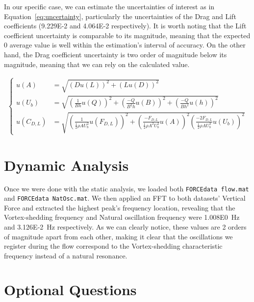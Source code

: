 \documentclass[12pt]{article}
\begin{document}
        In our specific case, we can estimate the uncertainties of interest as in Equation~\ref{eq:uncertainty}, particularly the uncertainties of the Drag and Lift coefficients (\num{9.229E-2} and \num{4.064E-2} respectively). It is worth noting that the Lift coefficient uncertainty is comparable to its magnitude, meaning that the expected 0 average value is well within the estimation's interval of accuracy. On the other hand, the Drag coefficient uncertainty is two order of magnitude below its magnitude, meaning that we can rely on the calculated value.

        \begin{align} \label{eq:uncertainty}
                \begin{cases}
                        u(A) &= \sqrt{\left(D u(L)\right)^2 + \left( L u(D) \right)^2}\\
                        u(U_b) &= \sqrt{\left(\frac{1}{B h} u(Q)\right)^2 + \left(\frac{-Q}{B^2 h} u(B)\right)^2 + \left(\frac{-Q}{B h^2} u(h)\right)^2}\\
                        u(C_{D,L}) &= \sqrt{\left(\frac{1}{\frac{1}{2} \rho A U_b^2} u(F_{D,L})\right)^2 + \left(\frac{-F_{D,L}}{\frac{1}{2} \rho A^2 U_b^2} u(A)\right)^2 \left(\frac{-2 F_{D,L}}{\frac{1}{2} \rho A U_b^3} u(U_b)\right)^2}
                \end{cases}
        \end{align}

\section{Dynamic Analysis} \label{sec:dynamic}

        Once we were done with the static analysis, we loaded both \texttt{FORCEdata flow.mat} and \texttt{FORCEdata NatOsc.mat}. We then applied an FFT to both datasets' Vertical Force and extracted the highest peak's frequency location, revealing that the Vortex-shedding frequency and Natural oscillation frequency were \SI{1.008E0}{\hertz} and \SI{3.126E-2}{\hertz} respectively. As we can clearly notice, these values are 2 orders of magnitude apart from each other, making it clear that the oscillations we register during the flow correspond to the Vortex-shedding characteristic frequency instead of a natural resonance.

\section{Optional Questions} \label{sec:optional}
\end{document}
